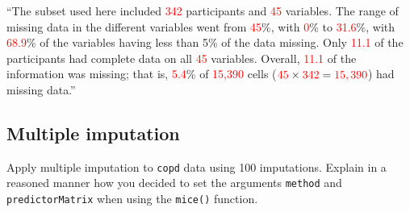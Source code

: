 \documentclass[10pt,a4paper,twoside]{article}\usepackage[]{graphicx}\usepackage[]{xcolor}
\begin{document}
“The subset used here included \textcolor{red}{342} participants and \textcolor{red}{45} variables. The range of missing data in the different variables went from \textcolor{red}{45}\%, with \textcolor{red}{0}\% to \textcolor{red}{31.6}\%, with \textcolor{red}{68.9}\% of the variables having less than 5\% of the data missing. Only \textcolor{red}{11.1} of the participants had complete data on all  \textcolor{red}{45} variables. Overall, \textcolor{red}{11.1} of the information was missing; that is, \textcolor{red}{5.4}\% of  \textcolor{red}{15,390} cells ($\textcolor{red}{45} \times \textcolor{red}{342} = \textcolor{red}{15,390}$) had missing data.”

\subsection{Multiple imputation}
Apply multiple imputation to \texttt{copd} data using 100 imputations. Explain in a reasoned manner how you decided to set the arguments \texttt{method} and \texttt{predictorMatrix} when using the \texttt{mice()} function.\\[5pt]
\end{document}

